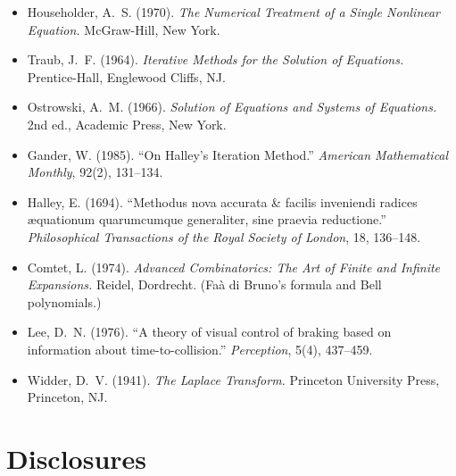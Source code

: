 \documentclass[11pt]{article}
\begin{document}
\begin{itemize}\setlength{\itemsep}{0.4em}

  \item[{[1]}]\hypertarget{ref:1}{} Householder, A.~S. (1970).
    \textit{The Numerical Treatment of a Single Nonlinear Equation.}
    McGraw-Hill, New York.

  \item[{[2]}]\hypertarget{ref:2}{} Traub, J.~F. (1964).
    \textit{Iterative Methods for the Solution of Equations.}
    Prentice-Hall, Englewood Cliffs, NJ.

  \item[{[3]}]\hypertarget{ref:3}{} Ostrowski, A.~M. (1966).
    \textit{Solution of Equations and Systems of Equations.}
    2nd ed., Academic Press, New York.

  \item[{[4]}]\hypertarget{ref:4}{} Gander, W. (1985).
    ``On Halley's Iteration Method.''
    \textit{American Mathematical Monthly}, 92(2), 131--134.

  \item[{[5]}]\hypertarget{ref:5}{} Halley, E. (1694).
    ``Methodus nova accurata \& facilis inveniendi radices
    \ae quationum quarumcumque generaliter, sine praevia reductione.''
    \textit{Philosophical Transactions of the Royal Society of London},
    18, 136--148.

  \item[{[6]}]\hypertarget{ref:6}{} Comtet, L. (1974).
    \textit{Advanced Combinatorics: The Art of Finite and Infinite Expansions.}
    Reidel, Dordrecht. (Fa\`a di Bruno's formula and Bell polynomials.)

  \item[{[7]}]\hypertarget{ref:7}{} Lee, D.~N. (1976).
    ``A theory of visual control of braking based on information about
    time-to-collision.'' \textit{Perception}, 5(4), 437--459.

  \item[{[8]}]\hypertarget{ref:8}{} Widder, D.~V. (1941).
    \textit{The Laplace Transform.} Princeton University Press, Princeton, NJ.

\end{itemize}

\newpage
\section{Disclosures}
\end{document}
